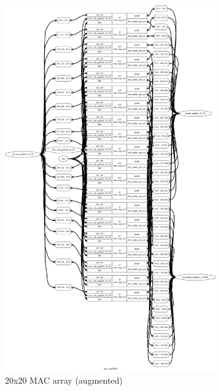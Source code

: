 \documentclass[11pt]{article}
\begin{document}
\begin{figure}[H]
    \centering
    \begin{subfigure}{.45\textwidth}
      \centering
      \begin{framed}
        \includegraphics[width=\linewidth]{images/mac_aug20x20.dot.png}
        \caption{20x20 MAC array (augmented)}
      \end{framed}
    \end{subfigure}
    \begin{subfigure}{.45\textwidth}
      \centering

\end{subfigure}
\end{figure}
\end{document}
